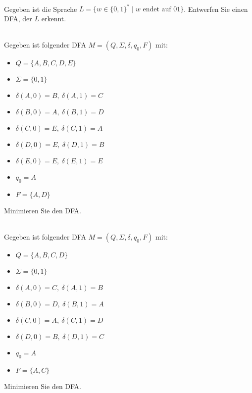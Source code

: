 \newcommand{\printpraesenzlsg}{false}
\newcommand{\printloesungen}{false}
\newcommand{\printbewertungen}{false}
\newcommand{\blattnummer}{5}

\usepackage{bussproofs}

\iforiginal{}

	



\\

Gegeben ist die Sprache $L = \{ w \in \{0,1\}^* \mid w \text{ endet auf } 01 \}$.
Entwerfen Sie einen DFA, der $L$ erkennt.

\\
Gegeben ist folgender DFA $M = (Q, \Sigma, \delta, q_0, F)$ mit:
\begin{itemize}
    \item $Q = \{A, B, C, D, E\}$
    \item $\Sigma = \{0,1\}$
    \item $\delta(A,0)=B,\ \delta(A,1)=C$
    \item $\delta(B,0)=A,\ \delta(B,1)=D$
    \item $\delta(C,0)=E,\ \delta(C,1)=A$
    \item $\delta(D,0)=E,\ \delta(D,1)=B$
    \item $\delta(E,0)=E,\ \delta(E,1)=E$
    \item $q_0 = A$
    \item $F = \{A, D\}$
\end{itemize}
Minimieren Sie den DFA. 

\\
Gegeben ist folgender DFA $M = (Q, \Sigma, \delta, q_0, F)$ mit:
\begin{itemize}
    \item $Q = \{A, B, C, D\}$
    \item $\Sigma = \{0,1\}$
    \item $\delta(A,0)=C,\ \delta(A,1)=B$
    \item $\delta(B,0)=D,\ \delta(B,1)=A$
    \item $\delta(C,0)=A,\ \delta(C,1)=D$
    \item $\delta(D,0)=B,\ \delta(D,1)=C$
    \item $q_0 = A$
    \item $F = \{A,C\}$
\end{itemize}
Minimieren Sie den DFA.


